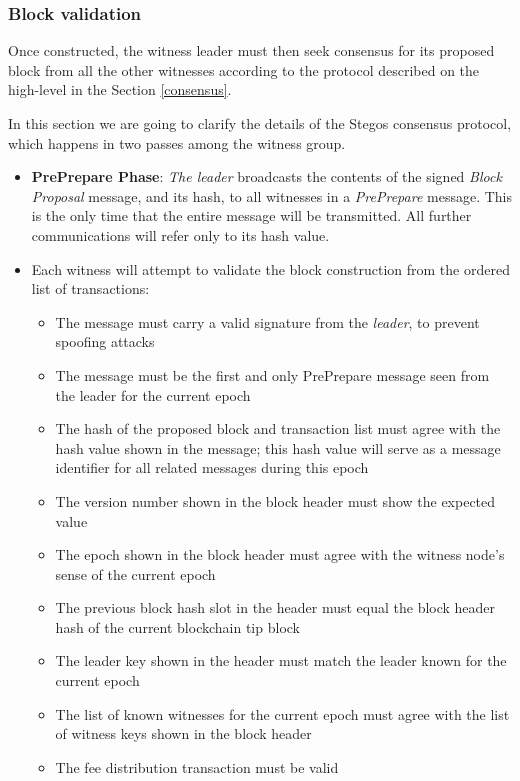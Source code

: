 \documentclass[a4paper, 10pt, conference]{ieeeconf}
\begin{document}
\subsubsection{Block validation} Once constructed, the witness leader must then seek consensus for its proposed block from all the other witnesses according to the protocol described on the high-level in the Section \ref{consensus}. 

In this section we are going to clarify the details of the Stegos consensus protocol, which happens in two passes among the witness group.

\begin{itemize}
	\item {\textbf{PrePrepare Phase}: \textit{The leader} broadcasts the contents of the signed \textit{Block Proposal} message, and its hash, to all witnesses in a \textit{PrePrepare} message. This is the only time that the entire message will be transmitted. All further communications will refer only to its hash value.}
	\item {Each witness will attempt to validate the block construction from the ordered list of transactions:
		\begin{itemize}
			\item {The message must carry a valid signature from the \textit{leader}, to prevent spoofing attacks}
			\item {The message must be the first and only PrePrepare message seen from the leader for the current epoch}
			\item {The hash of the proposed block and transaction list must agree with the hash value shown in the message; this hash value will serve as a message identifier for all related messages during this epoch}
			\item {The version number shown in the block header must show the expected value}
			\item {The epoch shown in the block header must agree with the witness node's sense of the current epoch}
			\item {The previous block hash slot in the header must equal the block header hash of the current blockchain tip block}
			\item {The leader key shown in the header must match the leader known for the current epoch}
			\item {The list of known witnesses for the current epoch must agree with the list of witness keys shown in the block header}
			\item {The fee distribution transaction must be valid}

\end{itemize}}
\end{itemize}
\end{document}
